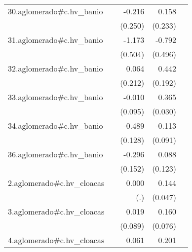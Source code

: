 {\begin{longtable}{l*{4}{D{.}{.}{-1}}}
\addlinespace
30.aglomerado#c.hv\_banio&                     &      -0.216         &       0.158         &                     \\
            &                     &     (0.250)         &     (0.233)         &                     \\
\addlinespace
31.aglomerado#c.hv\_banio&                     &      -1.173\sym{*}  &      -0.792         &                     \\
            &                     &     (0.504)         &     (0.496)         &                     \\
\addlinespace
32.aglomerado#c.hv\_banio&                     &       0.064         &       0.442\sym{*}  &                     \\
            &                     &     (0.212)         &     (0.192)         &                     \\
\addlinespace
33.aglomerado#c.hv\_banio&                     &      -0.010         &       0.365\sym{***}&                     \\
            &                     &     (0.095)         &     (0.030)         &                     \\
\addlinespace
34.aglomerado#c.hv\_banio&                     &      -0.489\sym{***}&      -0.113         &                     \\
            &                     &     (0.128)         &     (0.091)         &                     \\
\addlinespace
36.aglomerado#c.hv\_banio&                     &      -0.296         &       0.088         &                     \\
            &                     &     (0.152)         &     (0.123)         &                     \\
\addlinespace
2.aglomerado#c.hv\_cloacas&                     &       0.000         &       0.144\sym{**} &                     \\
            &                     &         (.)         &     (0.047)         &                     \\
\addlinespace
3.aglomerado#c.hv\_cloacas&                     &       0.019         &       0.160\sym{*}  &                     \\
            &                     &     (0.089)         &     (0.076)         &                     \\
\addlinespace
4.aglomerado#c.hv\_cloacas&                     &       0.061         &       0.201\sym{***}&                     \\

\end{longtable}}
